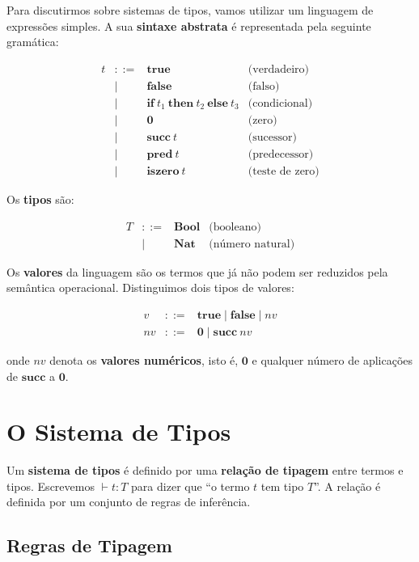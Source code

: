 Para discutirmos sobre sistemas de tipos, vamos utilizar um linguagem
de expressões simples. A sua \textbf{sintaxe abstrata} é representada
pela seguinte gramática:

\[
  \begin{array}{lcll}
    t & ::= & \mathbf{true}  & \text{(verdadeiro)} \\
    & \mid & \mathbf{false} & \text{(falso)} \\
    & \mid & \mathbf{if}\ t_1\ \mathbf{then}\ t_2\ \mathbf{else}\ t_3
    & \text{(condicional)} \\
    & \mid & \mathbf{0} & \text{(zero)} \\
    & \mid & \mathbf{succ}\ t & \text{(sucessor)} \\
    & \mid & \mathbf{pred}\ t & \text{(predecessor)} \\
    & \mid & \mathbf{iszero}\ t & \text{(teste de zero)}
  \end{array}
\]

Os \textbf{tipos} são:

\[
  \begin{array}{lcll}
    T & ::= & \mathbf{Bool} & \text{(booleano)} \\
    & \mid & \mathbf{Nat}  & \text{(número natural)}
  \end{array}
\]

Os \textbf{valores} da linguagem são os termos que já não podem ser
reduzidos pela semântica operacional. Distinguimos dois tipos de valores:

\[
  \begin{array}{lcll}
    v & ::= & \mathbf{true} \mid \mathbf{false} \mid nv \\
    nv & ::= & \mathbf{0} \mid \mathbf{succ}\ nv
  \end{array}
\]

onde \(nv\) denota os \textbf{valores numéricos}, isto é, \(\mathbf{0}\) e
qualquer número de aplicações de \(\mathbf{succ}\) a \(\mathbf{0}\).

\section{O Sistema de Tipos}

Um \textbf{sistema de tipos} é definido por uma \textbf{relação de
tipagem} entre termos e tipos. Escrevemos \(\vdash t : T\) para dizer
que ``o termo \(t\) tem tipo \(T\)''. A relação é definida por um
conjunto de regras de inferência.

\subsection{Regras de Tipagem}

